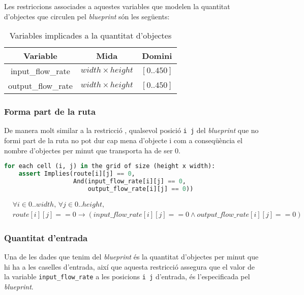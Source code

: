 Les restriccions associades a aquestes variables que modelen la quantitat d'objectes que circulen pel \textit{blueprint} són les següents:
\begin{table}[h]
    \centering
    \begin{tabular}{|c|c|c|}
    \hline
    \textbf{Variable} & \textbf{Mida} & \textbf{Domini} \\
    \hline
    input\_flow\_rate & $width \times height$ & $[0..450]$ \\
    \hline
    output\_flow\_rate & $width \times height$ & $[0..450]$ \\
    \hline
    \end{tabular}
    \caption{Variables implicades a la quantitat d'objectes}
    \label{item_flow_rate-variables}
\end{table}


\subsubsection{Forma part de la ruta}
De manera molt similar a la restricció , qualsevol posició \texttt{i j} del \textit{blueprint} que no formi part de la ruta no pot dur cap mena d'objecte i com a conseqüència el nombre d'objectes per minut que transporta ha de ser 0.

\begin{lstlisting}[language=Python, caption=Part of Route]
for each cell (i, j) in the grid of size (height x width):
    assert Implies(route[i][j] == 0, 
                   And(input_flow_rate[i][j] == 0,
                       output_flow_rate[i][j] == 0))
\end{lstlisting}
\begin{align*}
    &\forall i \in 0..width, \, \forall j \in 0..height, \\
    & route[i][j]==0 \rightarrow (input\_flow\_rate[i][j] == 0 \land output\_flow\_rate[i][j] == 0)
\end{align*}


\subsubsection{Quantitat d'entrada}
Una de les dades que tenim del \textit{blueprint} és la quantitat d'objectes per minut que hi ha a les caselles d'entrada, així que aquesta restricció assegura que el valor de la variable \texttt{input\_flow\_rate} a les posicions \texttt{i j} d'entrada, és l'especificada pel \textit{blueprint}.

